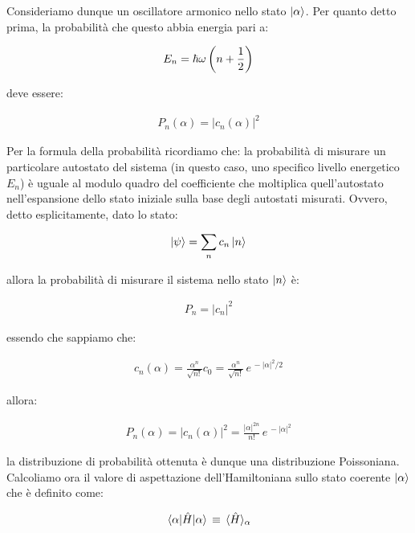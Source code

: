 	Consideriamo dunque un oscillatore armonico nello stato $\ket{\alpha}$. Per quanto detto prima, la probabilità che questo abbia energia pari a:
	
\begin{align*}
	E_n = \hbar \omega \, \qty(n + \frac{1}{2})
\end{align*}

	deve essere:
	
\begin{align*}
	P_n(\alpha) = |c_n(\alpha)|^2
\end{align*}

\begin{myapprf}
	Per la formula della probabilità ricordiamo che: la probabilità di misurare un particolare autostato del sistema (in questo caso, uno specifico livello energetico $E_n$) è uguale al modulo quadro del coefficiente che moltiplica quell'autostato nell'espansione dello stato iniziale sulla base degli autostati misurati. Ovvero, detto esplicitamente, dato lo stato:

\begin{align*}
	\ket{\psi} = \sum_n c_n \ket{n}
\end{align*}

	allora la probabilità di misurare il sistema nello stato $\ket{n}$ è:
	
\begin{align*}
	P_n = |c_n|^2
\end{align*}
\end{myapprf}

	essendo che sappiamo che:
	
\begin{align*}
	c_n(\alpha) = \frac{\alpha^n}{\sqrt{n!}} c_0 = \frac{\alpha^n}{\sqrt{n!}} \, e^{\, - |\alpha|^2/2}  
\end{align*}

	allora:
	
\begin{align*}
	P_n(\alpha) = |c_n(\alpha)|^2 = \frac{|\alpha|^{2n}}{n!} \, e^{\, -|\alpha|^2}
\end{align*}

	la distribuzione di probabilità ottenuta è dunque una distribuzione Poissoniana. Calcoliamo ora il valore di aspettazione dell'Hamiltoniana sullo stato coerente $\ket{\alpha}$ che è definito come:
	
\begin{align*}
	\mel{\alpha}{\hat{H}}{\alpha} \, \equiv \, \langle \hat{H} \rangle_{\alpha} 
\end{align*}

